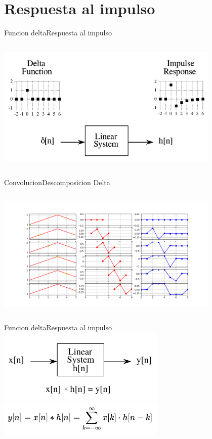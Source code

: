 \section{Respuesta al impulso}
\begin{frame}{Funcion delta}{Respuesta al impulso}
   \begin{columns}[c]
      \begin{column}{1\textwidth}
         \centering\includegraphics[width=0.8\textwidth]{4_clase/respuesta_impulso}
      \end{column}
   \end{columns}
   \vfill
\end{frame}
\begin{frame}{Convolucion}{Descomposicion Delta}
   \begin{columns}[c]
      \begin{column}{1\textwidth}
         \centering\includegraphics[width=0.8\textwidth]{4_clase/descomposicion_delta}
      \end{column}
   \end{columns}
   \vfill
\end{frame}
\begin{frame}{Funcion delta}{Respuesta al impulso}
   \centering\includegraphics[width=0.6\textwidth]{4_clase/entrada_conv_h}\\
   \centering\includegraphics[width=0.6\textwidth]{4_clase/convolucion_eq}
   \vfill
\end{frame}
